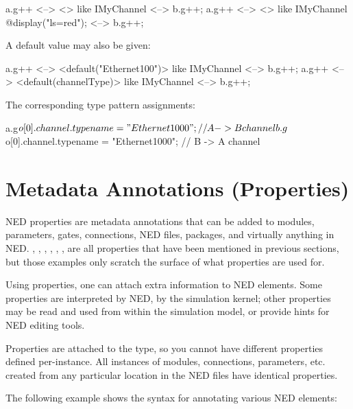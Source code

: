 \begin{ned}
a.g++ <--> <> like IMyChannel <--> b.g++;
a.g++ <--> <> like IMyChannel {@display("ls=red");} <--> b.g++;
\end{ned}

A default value may also be given:

\begin{ned}
a.g++ <--> <default("Ethernet100")> like IMyChannel <--> b.g++;
a.g++ <--> <default(channelType)> like IMyChannel <--> b.g++;
\end{ned}

The corresponding type pattern assignments:

\begin{ned}
a.g$o[0].channel.typename = "Ethernet1000";  // A -> B channel
b.g$o[0].channel.typename = "Ethernet1000";  // B -> A channel
\end{ned}


\section{Metadata Annotations (Properties)}
\label{sec:ch-ned-lang:properties}

NED properties are metadata annotations that can be added to modules, parameters,
gates, connections, NED files, packages, and virtually anything in NED.
, , , , ,
,  are all properties that have been mentioned in
previous sections, but those examples only scratch the surface of what
properties are used for.


Using properties, one can attach extra information to NED elements. Some
properties are interpreted by NED, by the simulation kernel; other
properties may be read and used from within the simulation model, or
provide hints for NED editing tools.

Properties are attached to the type, so you cannot have different properties defined
per-instance. All instances of modules, connections,
parameters, etc. created from any particular location in the NED files have
identical properties.

The following example shows the syntax for annotating various NED elements:


